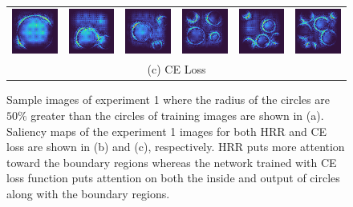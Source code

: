 \documentclass[letterpaper]{article} %
\begin{document}
\begin{figure}[!htbp]
\begin{tabular}{cccccc}
\multicolumn{1}{c}{\includegraphics[width=0.125\columnwidth]{saliency/ce/circle/circle_1.png}} \hspace{-12pt} &  \multicolumn{1}{c}{\includegraphics[width=0.125\columnwidth]{saliency/ce/circle/circle_2.png}} \hspace{-12pt} & \multicolumn{1}{c}{\includegraphics[width=0.125\columnwidth]{saliency/ce/circle/circle_3.png}} \hspace{-12pt} & \multicolumn{1}{c}{\includegraphics[width=0.125\columnwidth]{saliency/ce/circle/circle_4.png}} \hspace{-12pt} & \multicolumn{1}{c}{\includegraphics[width=0.125\columnwidth]{saliency/ce/circle/circle_5.png}} \hspace{-12pt} & \multicolumn{1}{c}{\includegraphics[width=0.125\columnwidth]{saliency/ce/circle/circle_6.png}} \\ 
\multicolumn{6}{c}{(c) CE Loss}
\end{tabular}
\caption{Sample images of experiment 1 where the radius of the circles are $50\%$ greater than the circles of training images are shown in (a). Saliency maps of the experiment 1 images for both HRR and CE loss are shown in (b) and (c), respectively. HRR puts more attention toward the boundary regions whereas the network trained with CE loss function puts attention on both the inside and output of circles along with the boundary regions.}
\label{fig:exp_1_saliency}
\end{figure}
\end{document}
